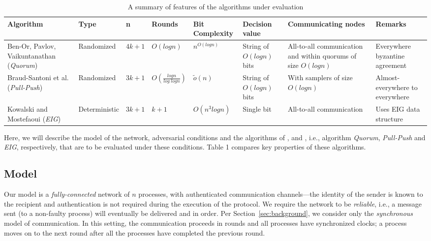 \begin{table*}[t]
    \caption{A summary of features of the algorithms under evaluation}
    \scriptsize
        \setlength{\tabcolsep}{3pt}
    \begin{tabular}{p{1.5cm}llp{1.4cm}p{1.3cm}p{1.2cm}p{1.4cm}p{1.2cm}}
\hline
\textbf{Algorithm} & \textbf{Type} &\textbf{n} & \textbf{Rounds} & \textbf{Bit Complexity } &\textbf{Decision value} & \textbf{Commun\-icating nodes}& \textbf{Remarks} \\ \hline
Ben-Or, Pavlov, Vaikuntanathan \cite{BPV06} (\textit{Quorum})& Randomized & $4k + 1$ & $O(logn)$ & $n^{O(logn)}$      &String of $O(logn)$ bits &All-to-all communication and within quorums of size $O(logn)$   & Everywhere byzantine agreement     \\
          Braud-Santoni et al. \cite{BGH13} (\textit{Pull-Push}) & Randomized & $3k + 1$ & $O(\frac{logn}{log\; log n})$ & $\tilde{o}(n)$      &String of $O(logn)$ bits &With samplers of size $O(logn)$  & Almost-everywhere to everywhere     \\
                Kowalski and Mostefaoui \cite{KM13} (\textit{EIG}) & Deterministic & $3k + 1$     & $k + 1$                     & $O(n^3logn)$ &Single bit  &All-to-all communication & Uses EIG data structure\\ \hline
%
\end{tabular}
\end{table*}
Here, we will describe the model of the network, adversarial conditions and the algorithms of \cite{BPV06}, \cite{BGH13} and \cite{KM13}, i.e., algorithm \textit{Quorum}, \textit{Pull-Push} and \textit{EIG}, respectively, that are to be evaluated under these conditions. Table 1 compares key properties of these algorithms.


\subsection{Model}
Our model is a \textit{fully-connected} network of $n$ processes, with authenticated communication channels---the identity of the sender is known to the recipient and authentication is not required during the execution of the protocol. We require the network to be \textit{reliable}, i.e., a message sent (to a non-faulty process) will eventually be delivered and in order. Per Section~\ref{sec:background}, we consider only the \textit{synchronous} model of communication. In this setting, the communication proceeds in rounds and all processes have synchronized clocks; a process moves on to the next round after all the processes have completed the previous round. %

